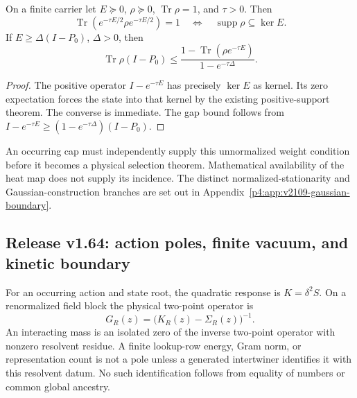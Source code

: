 \documentclass[12pt,a4paper]{article}
\begin{document}
\begin{theorem}
\label{p4:thm:v2109-euclidean-weight-support}
On a finite carrier let \(E\succeq0\), \(\rho\succeq0\),
\(\operatorname{Tr}\rho=1\), and \(\tau>0\).  Then
\[
 \operatorname{Tr}(e^{-\tau E/2}\rho e^{-\tau E/2})=1
 \quad\Longleftrightarrow\quad
 \operatorname{supp}\rho\subseteq\ker E.
\]
If \(E\ge\Delta(I-P_0)\), \(\Delta>0\), then
\[
 \operatorname{Tr}\rho(I-P_0)\le
 \frac{1-\operatorname{Tr}(\rho e^{-\tau E})}{1-e^{-\tau\Delta}}.
\]
\end{theorem}
\begin{proof}
The positive operator \(I-e^{-\tau E}\) has precisely \(\ker E\) as
kernel.  Its zero expectation forces the state into that kernel by the
existing positive-support theorem.  The converse is immediate.  The gap
bound follows from
\(I-e^{-\tau E}\ge(1-e^{-\tau\Delta})(I-P_0)\).
\end{proof}
An occurring cap must independently supply this unnormalized weight
condition before it becomes a physical selection theorem.  Mathematical
availability of the heat map does not supply its incidence.  The distinct
normalized-stationarity and Gaussian-construction branches are set out in
Appendix~\ref{p4:app:v2109-gaussian-boundary}.





\subsection{Release v1.64: action poles, finite vacuum, and kinetic boundary}
\label{p4:sec:v164-action-poles-vacuum}

\begin{theorem}
\label{p4:thm:v164-action-hessian-pole-owner}
For an occurring action and state root, the quadratic response is
\(K=\delta^2S\).  On a renormalized field block the physical two-point
operator is
\[
 G_R(z)=\bigl(K_R(z)-\Sigma_R(z)\bigr)^{-1}.
\]
An interacting mass is an isolated zero of the inverse two-point operator
with nonzero resolvent residue.  A finite lookup-row energy, Gram norm, or
representation count is not a pole unless a generated intertwiner identifies
it with this resolvent datum.  No such identification follows from equality
of numbers or common global ancestry.
\end{theorem}
\end{document}
